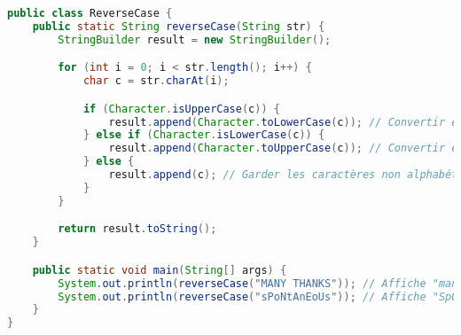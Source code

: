 \documentclass{article}
\begin{document}
\begin{lstlisting}[language=Java]
public class ReverseCase {
    public static String reverseCase(String str) {
        StringBuilder result = new StringBuilder();

        for (int i = 0; i < str.length(); i++) {
            char c = str.charAt(i);

            if (Character.isUpperCase(c)) {
                result.append(Character.toLowerCase(c)); // Convertir en minuscule
            } else if (Character.isLowerCase(c)) {
                result.append(Character.toUpperCase(c)); // Convertir en majuscule
            } else {
                result.append(c); // Garder les caractères non alphabétiques
            }
        }

        return result.toString();
    }

    public static void main(String[] args) {
        System.out.println(reverseCase("MANY THANKS")); // Affiche "many thanks"
        System.out.println(reverseCase("sPoNtAnEoUs")); // Affiche "SpOnTaNeOuS"
    }
}
\end{lstlisting}
\clearpage
\end{document}
